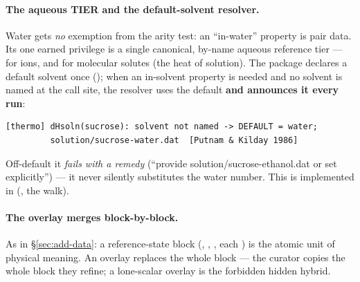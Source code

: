 \documentclass[11pt,a4paper]{article}
\begin{document}
\paragraph{The aqueous TIER and the default-solvent resolver.}  Water gets
\emph{no} exemption from the arity test: an ``in-water'' property is pair data.
Its one earned privilege is a single canonical, by-name aqueous reference tier
---  for ions, and
 for molecular solutes
(the heat of solution).  The package declares a default solvent once
(); when an in-solvent property is needed and no solvent is
named at the call site, the resolver uses the default \textbf{and announces it
every run}:

\begin{lstlisting}
[thermo] dHsoln(sucrose): solvent not named -> DEFAULT = water;
         solution/sucrose-water.dat  [Putnam & Kilday 1986]
\end{lstlisting}

\noindent Off-default it \emph{fails with a remedy} (``provide
solution/sucrose-ethanol.dat or set  explicitly'') --- it
never silently substitutes the water number.  This is implemented in
 (, the  walk).

\paragraph{The overlay merges block-by-block.}  As in \S\ref{sec:add-data}: a
reference-state block (, ,
, each ) is the atomic unit
of physical meaning.  An overlay replaces the whole block --- the curator copies
the whole block they refine; a lone-scalar overlay is the forbidden hidden
hybrid.
\end{document}
